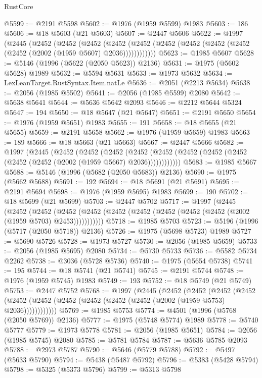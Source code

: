\begin{lexlean}{RustCore}
\begin{coremodule}
@5599 := @2191 @5598
@5602 := @1976 (@1959 @5599) @1983
@5603 := 186
@5606 := @18 @5603 (@21 @5603)
@5607 := @2447 @5606
@5622 := @1997
    (@2445
      (@2452
        (@2452
          (@2452
            (@2452 (@2452 (@2452 (@2452 (@2452 (@2452 (@2452 (@2002 (@1959 @5607) @2036))))))))))))
@5623 := @1985 @5607
@5628 := @5146 (@1996 (@5622 (@2050 @5623)) @2136)
@5631 := @1975 (@5602 @5628) @1989
@5632 := @5594 @5631
@5633 := @1973 @5632
@5634 := LexLeanTarget.RustSyntax.Item.natLe
@5636 := @2051 (@2213 @5634)
@5638 := @2056 (@1985 @5502)
@5641 := @2056 (@1985 @5599) @2080
@5642 := @5638 @5641
@5644 := @5636 @5642 @2093
@5646 := @2212 @5644 @5324
@5647 := 194
@5650 := @18 @5647 (@21 @5647)
@5651 := @2191 @5650
@5654 := @1976 (@1959 @5651) @1983
@5655 := 191
@5658 := @18 @5655 (@21 @5655)
@5659 := @2191 @5658
@5662 := @1976 (@1959 @5659) @1983
@5663 := 189
@5666 := @18 @5663 (@21 @5663)
@5667 := @2447 @5666
@5682 := @1997
    (@2445
      (@2452
        (@2452
          (@2452
            (@2452 (@2452 (@2452 (@2452 (@2452 (@2452 (@2452 (@2002 (@1959 @5667) @2036))))))))))))
@5683 := @1985 @5667
@5688 := @5146 (@1996 (@5682 (@2050 @5683)) @2136)
@5690 := @1975 (@5662 @5688)
@5691 := 192
@5694 := @18 @5691 (@21 @5691)
@5695 := @2191 @5694
@5698 := @1976 (@1959 @5695) @1983
@5699 := 190
@5702 := @18 @5699 (@21 @5699)
@5703 := @2447 @5702
@5717 := @1997
    (@2445
      (@2452
        (@2452
          (@2452 (@2452 (@2452 (@2452 (@2452 (@2452 (@2452 (@2002 (@1959 @5703) @2453)))))))))))
@5718 := @1985 @5703
@5723 := @5196 (@1996 (@5717 (@2050 @5718)) @2136)
@5726 := @1975 (@5698 @5723) @1989
@5727 := @5690 @5726
@5728 := @1973 @5727
@5730 := @2056 (@1985 @5659)
@5733 := @2056 (@1985 @5695) @2080
@5734 := @5730 @5733
@5736 := @5582 @5734 @2262
@5738 := @3036 (@5728 @5736)
@5740 := @1975 (@5654 @5738)
@5741 := 195
@5744 := @18 @5741 (@21 @5741)
@5745 := @2191 @5744
@5748 := @1976 (@1959 @5745) @1983
@5749 := 193
@5752 := @18 @5749 (@21 @5749)
@5753 := @2447 @5752
@5768 := @1997
    (@2445
      (@2452
        (@2452
          (@2452
            (@2452 (@2452 (@2452 (@2452 (@2452 (@2452 (@2452 (@2002 (@1959 @5753) @2036))))))))))))
@5769 := @1985 @5753
@5774 := @4501 (@1996 (@5768 (@2050 @5769)) @2136)
@5777 := @1975 (@5748 @5774) @1989
@5778 := @5740 @5777
@5779 := @1973 @5778
@5781 := @2056 (@1985 @5651)
@5784 := @2056 (@1985 @5745) @2080
@5785 := @5781 @5784
@5787 := @5636 @5785 @2093
@5788 := @2973 @5787
@5790 := @5646 (@5779 @5788)
@5792 := @5497 (@5633 @5790)
@5794 := @5438 (@5487 @5792)
@5796 := @5383 (@5428 @5794)
@5798 := @5325 (@5373 @5796)
@5799 := @5313 @5798

\end{coremodule}
\end{lexlean}
